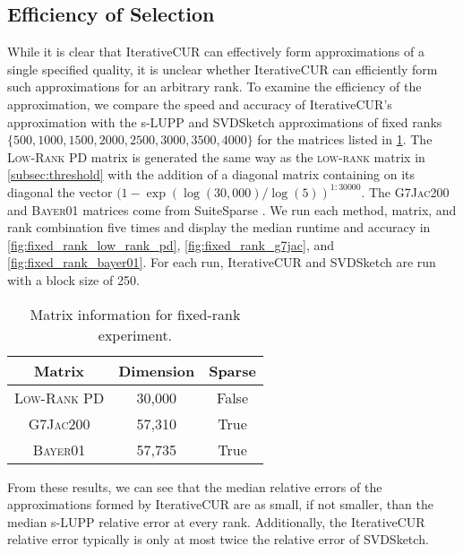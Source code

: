 \subsection{Efficiency of Selection}\label{subsec:fixed_rank}
While it is clear that IterativeCUR can effectively form approximations of a single specified quality, it is unclear whether IterativeCUR can efficiently form such approximations for an arbitrary rank. To examine the efficiency of the approximation, we compare the speed and accuracy of IterativeCUR's approximation with the s-LUPP and SVDSketch approximations of fixed ranks $\{500,1000,1500,2000,2500, 3000, 3500, 4000\}$ for the matrices listed in \cref{tab:fixed-rank}. The \textsc{Low-Rank PD} matrix is generated the same way as the \textsc{low-rank} matrix in \cref{subsec:threshold} with the addition of a diagonal matrix containing on its diagonal the vector $(1-\exp({\log(30,000)}/{\log(5)})^{1:30000}$. The \textsc{G7Jac200} and \textsc{Bayer01} matrices come from SuiteSparse \cite{davis2011university}.  We run each method, matrix, and rank combination five times and display the median runtime and accuracy in \cref{fig:fixed_rank_low_rank_pd},  \cref{fig:fixed_rank_g7jac}, and \cref{fig:fixed_rank_bayer01}. For each run, IterativeCUR and SVDSketch are run with a block size of 250.
\begin{table}[h]
    \centering
    \caption{Matrix information for fixed-rank experiment.} \label{tab:fixed-rank}
    \begin{tabular}{c|c|c}
    \toprule
    Matrix & Dimension & Sparse \\
   \hline
    \textsc{Low-Rank PD} & 30,000 & False\\
     \textsc{G7Jac200} & 57,310 & True\\
     \textsc{Bayer01} & 57,735 &True\\
    \end{tabular}
  \end{table}

From these results, we can see that the median relative errors of the approximations formed by IterativeCUR are as small, if not smaller, than the median s-LUPP relative error at every rank. Additionally, the IterativeCUR relative error typically is only at most twice the relative error of SVDSketch.  

